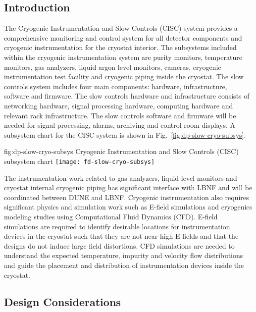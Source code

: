 \subsection{Introduction}
\label{sec:fddp-slow-cryo-intro}

The Cryogenic Instrumentation and Slow Controls (CISC) system provides a comprehensive monitoring and control system for all detector components and cryogenic instrumentation for the cryostat interior. The subsystems included within the cryogenic instrumentation system are purity monitors, temperature monitors, gas analyzers, liquid argon level monitors, cameras, cryogenic instrumentation test facility and cryogenic piping inside the cryostat. The slow controls system includes four main components: hardware, infrastructure, software and firmware. The slow controls hardware and infrastructure consists of networking hardware, signal processing hardware, computing hardware and relevant rack infrastructure. The slow controls software and firmware will be needed for signal processing, alarms, archiving and control room displays. A subsystem chart for the CISC system is shown in Fig.\ \ref{fig:dp-slow-cryo-subsys}.

\begin{dunefigure}{fig:dp-slow-cryo-subsys}
{Cryogenic Instrumentation and Slow Controls (CISC) subsystem chart}
\texttt{[image: fd-slow-cryo-subsys]}
\end{dunefigure}

The instrumentation work related to gas analyzers, liquid level
monitors and cryostat internal cryogenic piping has significant
interface with LBNF and will be coordinated between DUNE and LBNF.
Cryogenic instrumentation also requires significant physics and
simulation work such as E-field simulations and cryogenics modeling
studies using Computational Fluid Dynamics (CFD). E-field simulations
are required to identify desirable locations for instrumentation
devices in the cryostat such that they are not near high E-fields and
that the designs do not induce large field distortions. CFD
simulations are needed to understand the expected temperature,
impurity and velocity flow distributions and guide the placement and
distribution of instrumentation devices inside the cryostat.


\subsection{Design Considerations}
\label{sec:fddp-slow-cryo-des-consid}

